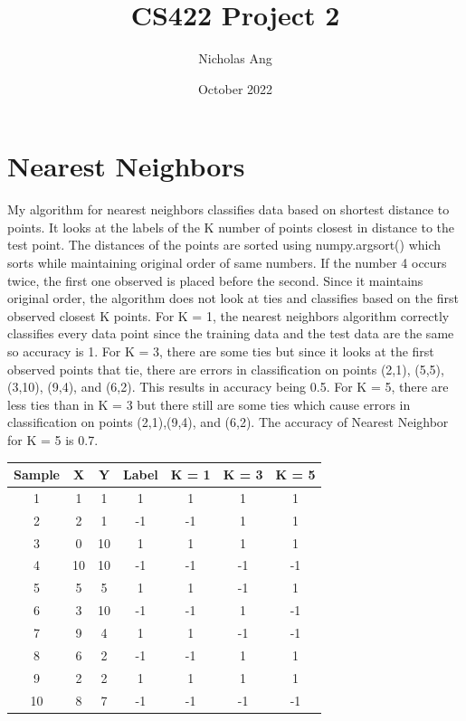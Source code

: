 \documentclass{article}
\title{CS422 Project 2}
\author{Nicholas Ang}
\date{October 2022}
\begin{document}
\graphicspath{{Images/}}

\maketitle
\clearpage
\section*{Nearest Neighbors}
My algorithm for nearest neighbors classifies data based on shortest distance to points. It looks at the labels of the K number of points closest in distance to the test point. The distances of the points are sorted using numpy.argsort() which sorts while maintaining original order of same numbers. If the number 4 occurs twice, the first one observed is placed before the second. Since it maintains original order, the algorithm does not look at ties and classifies based on the first observed closest K points. For K = 1, the nearest neighbors algorithm correctly classifies every data point since the training data and the test data are the same so accuracy is 1. For K = 3, there are some ties but since it looks at the first observed points that tie, there are errors in classification on points (2,1), (5,5), (3,10), (9,4), and (6,2). This results in accuracy being 0.5. For K = 5, there are less ties than in K = 3 but there still are some ties which cause errors in classification on points (2,1),(9,4), and (6,2). The accuracy of Nearest Neighbor for K = 5 is 0.7. 

\begin{table}[h!]
\centering
 \begin{tabular}{||c c c c c c c||} 
 \hline

Sample & X & Y & Label & K = 1 & K = 3 & K = 5\\ [0.5ex] 
 \hline\hline
1 & 1 & 1 & 1 & 1 & 1 & 1\\
2 & 2 & 1 & -1 & -1 & 1 & 1\\
3 & 0 & 10 & 1 & 1 & 1 & 1\\
4 & 10 & 10 & -1 & -1 & -1 & -1\\
5 & 5 & 5 & 1 & 1 & -1 & 1\\
6 & 3 & 10 & -1 & -1 & 1 & -1\\
7 & 9 & 4 & 1 & 1 & -1 & -1\\
8 & 6 & 2 & -1 & -1 & 1 & 1\\
9 & 2 & 2 & 1 & 1 & 1 & 1\\
10 & 8 & 7 & -1 & -1 & -1 & -1\\[1ex] 
 \hline
 \end{tabular}
\end{table}
\clearpage
\end{document}
